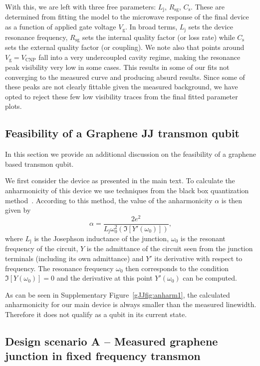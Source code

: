 With this, we are left with three free parameters: $L_\text{j}$, $R_\text{sg}$, $C_\text{s}$.
These are determined from fitting the model to the microwave response of the final device as a function of applied gate voltage $V_\text{g}$.
In broad terms, $L_\text{j}$ sets the device resonance frequency, $R_\text{sg}$ sets the internal quality factor (or loss rate) while $C_\text{s}$ sets the external quality factor (or coupling).
We note also that points around $V_\text{g} = V_\text{CNP}$ fall into a very undercoupled cavity regime, making the resonance peak visibility very low in some cases.
This results in some of our fits not converging to the measured curve and producing absurd results.
Since some of these peaks are not clearly fittable given the measured background, we have opted to reject these few low visibility traces from the final fitted parameter plots.

\subsection{Feasibility of a Graphene JJ transmon qubit}\label{sec:feasability}
\noindent In this section we provide an additional discussion on the feasibility of a graphene based transmon qubit.

We first consider the device as presented in the main text.
To calculate the anharmonicity of this device we use techniques from the black box quantization method~\cite{niggBlackBoxSuperconductingCircuit2012}.
According to this method, the value of the anharmonicity $\alpha$ is then given by
\begin{equation}
\alpha = \frac{2e^2}{L_\text{j}\omega_0^2(\Im [Y'(\omega_0)])},
\end{equation}
where $L_\text{j}$ is the Josephson inductance of the junction, $\omega_0$ is the resonant frequency of the circuit, $Y$ is the admittance of the circuit seen from the junction terminals (including its own admittance) and $Y'$ its derivative with respect to frequency.
The resonance frequency $\omega_0$ then corresponds to the condition $\Im [Y(\omega_0)] = 0$ and the derivative at this point $Y'(\omega_0)$ can be computed.

As can be seen in Supplementary Figure~\ref{gJJfig:anharm1}, the calculated anharmonicity for our main device is always smaller than the measured linewidth.
Therefore it does not qualify as a qubit in its current state.



\subsection{Design scenario A -- Measured graphene junction in fixed frequency transmon}\label{sec:scenA}

